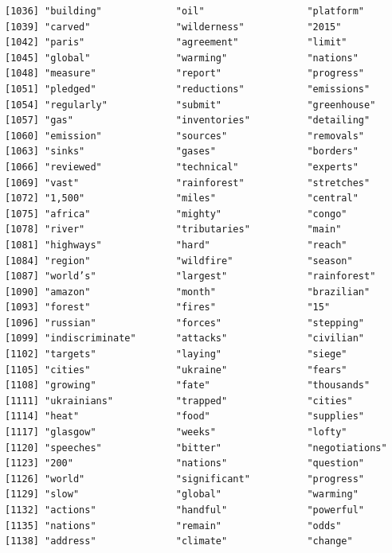\documentclass[
  letterpaper,
  DIV=11,
  numbers=noendperiod]{scrartcl}
\begin{document}
\begin{verbatim}
[1036] "building"             "oil"                  "platform"            
[1039] "carved"               "wilderness"           "2015"                
[1042] "paris"                "agreement"            "limit"               
[1045] "global"               "warming"              "nations"             
[1048] "measure"              "report"               "progress"            
[1051] "pledged"              "reductions"           "emissions"           
[1054] "regularly"            "submit"               "greenhouse"          
[1057] "gas"                  "inventories"          "detailing"           
[1060] "emission"             "sources"              "removals"            
[1063] "sinks"                "gases"                "borders"             
[1066] "reviewed"             "technical"            "experts"             
[1069] "vast"                 "rainforest"           "stretches"           
[1072] "1,500"                "miles"                "central"             
[1075] "africa"               "mighty"               "congo"               
[1078] "river"                "tributaries"          "main"                
[1081] "highways"             "hard"                 "reach"               
[1084] "region"               "wildfire"             "season"              
[1087] "world’s"              "largest"              "rainforest"          
[1090] "amazon"               "month"                "brazilian"           
[1093] "forest"               "fires"                "15"                  
[1096] "russian"              "forces"               "stepping"            
[1099] "indiscriminate"       "attacks"              "civilian"            
[1102] "targets"              "laying"               "siege"               
[1105] "cities"               "ukraine"              "fears"               
[1108] "growing"              "fate"                 "thousands"           
[1111] "ukrainians"           "trapped"              "cities"              
[1114] "heat"                 "food"                 "supplies"            
[1117] "glasgow"              "weeks"                "lofty"               
[1120] "speeches"             "bitter"               "negotiations"        
[1123] "200"                  "nations"              "question"            
[1126] "world"                "significant"          "progress"            
[1129] "slow"                 "global"               "warming"             
[1132] "actions"              "handful"              "powerful"            
[1135] "nations"              "remain"               "odds"                
[1138] "address"              "climate"              "change"              

\end{verbatim}
\end{document}
